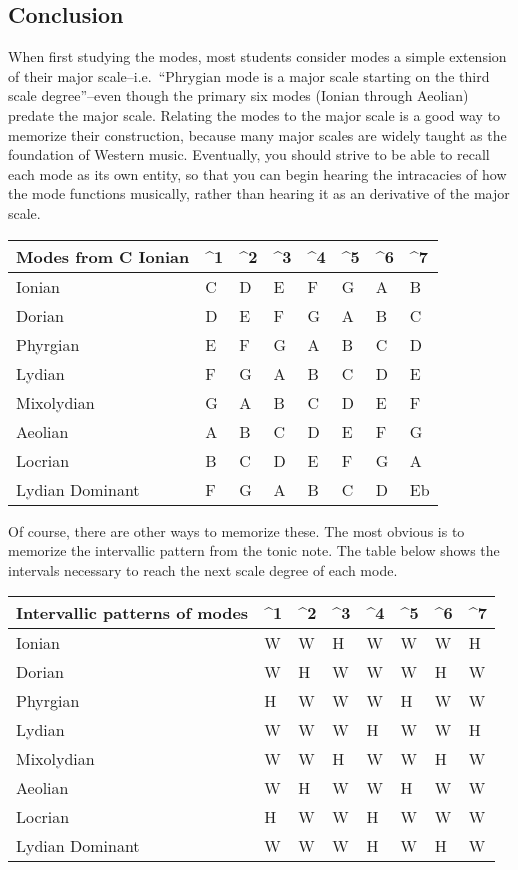 \documentclass{book}
\begin{document}
\hypertarget{conclusion-17}{%
\subsection{Conclusion}\label{conclusion-17}}

When first studying the modes, most students consider modes a simple extension
of their major scale--i.e.~``Phrygian mode is a major scale starting on the
third scale degree''--even though the primary six modes (Ionian through
Aeolian) predate the major scale. Relating the modes to the major scale is a
good way to memorize their construction, because many major scales are widely
taught as the foundation of Western music. Eventually, you should strive to be
able to recall each mode as its own entity, so that you can begin hearing the
intracacies of how the mode functions musically, rather than hearing it as an
derivative of the major scale.

\begin{longtable}[]{@{}llllllll@{}}
\toprule
Modes from C Ionian & \^{}1 & \^{}2 & \^{}3 & \^{}4 & \^{}5 & \^{}6 & \^{}7 \\
\midrule
\endhead
Ionian & C & D & E & F & G & A & B \\
Dorian & D & E & F & G & A & B & C \\
Phyrgian & E & F & G & A & B & C & D \\
Lydian & F & G & A & B & C & D & E \\
Mixolydian & G & A & B & C & D & E & F \\
Aeolian & A & B & C & D & E & F & G \\
Locrian & B & C & D & E & F & G & A \\
Lydian Dominant & F & G & A & B & C & D & Eb \\
\bottomrule
\end{longtable}

Of course, there are other ways to memorize these. The most obvious is to
memorize the intervallic pattern from the tonic note. The table below shows
the intervals necessary to reach the next scale degree of each mode.

\begin{longtable}[]{@{}llllllll@{}}
\toprule
Intervallic patterns of modes & \^{}1 & \^{}2 & \^{}3 & \^{}4 & \^{}5 & \^{}6
& \^{}7 \\
\midrule
\endhead
Ionian & W & W & H & W & W & W & H \\
Dorian & W & H & W & W & W & H & W \\
Phyrgian & H & W & W & W & H & W & W \\
Lydian & W & W & W & H & W & W & H \\
Mixolydian & W & W & H & W & W & H & W \\
Aeolian & W & H & W & W & H & W & W \\
Locrian & H & W & W & H & W & W & W \\
Lydian Dominant & W & W & W & H & W & H & W \\
\bottomrule
\end{longtable}
\end{document}
